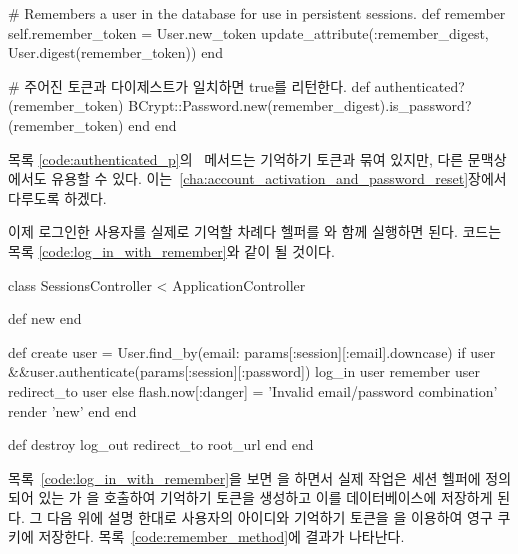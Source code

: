 {{\begin{codelisting}
\begin{code}
# Remembers a user in the database for use in persistent sessions. def remember self.remember_token = User.new_token update_attribute(:remember_digest, User.digest(remember_token)) end 

# 주어진 토큰과 다이제스트가 일치하면 true를 리턴한다. def authenticated?(remember_token) BCrypt::Password.new(remember_digest).is_password?(remember_token) end end \end{code} \end{codelisting} 

\noindent 목록 \ref{code:authenticated_p}의 \ 메서드는 기억하기 토큰과 묶여 있지만, 다른 문맥상에서도 유용할 수 있다. 이는~\ref{cha:account_activation_and_password_reset}장에서 다루도록 하겠다. 

이제 로그인한 사용자를 실제로 기억할 차례다  헬퍼를 와 함께 실행하면 된다. 코드는 목록 \ref{code:log_in_with_remember}와 같이 될 것이다. 

\begin{codelisting} \label{code:log_in_with_remember}  

\begin{code} class SessionsController < ApplicationController 

def new end 

def create user = User.find_by(email: params[:session][:email].downcase) if user &&user.authenticate(params[:session][:password]) log_in user remember user redirect_to user else flash.now[:danger] = 'Invalid email/password combination' render 'new' end end 

def destroy log_out redirect_to root_url end end \end{code} \end{codelisting} 

\noindent 목록~\ref{code:log_in_with_remember}을 보면 을 하면서 실제 작업은 세션 헬퍼에 정의 되어 있는  가 을 호출하여 기억하기 토큰을 생성하고 이를 데이터베이스에 저장하게 된다. 그 다음 위에 설명 한대로 사용자의 아이디와 기억하기 토큰을 을 이용하여 영구 쿠키에 저장한다. 목록~\ref{code:remember_method}에 결과가 나타난다. 

\begin{codelisting} \label{code:remember_method}  


\end{codelisting}}}
